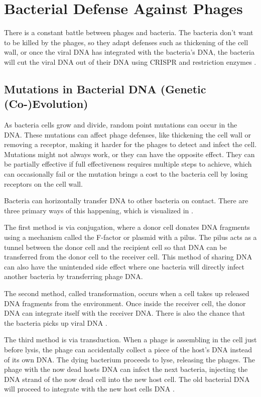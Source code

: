 \section{Bacterial Defense Against Phages} 
There is a constant battle between phages and bacteria. 
The bacteria don't want to be killed by the phages, so they adapt defenses such as thickening of the cell wall, or once the viral DNA has integrated with the bacteria's DNA, the bacteria will cut the viral DNA out of their DNA using CRISPR and restriction enzymes \cite{iglerPhenotypicFluxRole2022}. 

\subsection{Mutations in Bacterial DNA (Genetic (Co-)Evolution)}
As bacteria cells grow and divide, random point mutations can occur in the DNA. 
These mutations can affect phage defenses, like thickening the cell wall or removing a receptor, making it harder for the phages to detect and  infect the cell. 
Mutations might not always work, or they can have the opposite effect. 
They can be partially effective if full effectiveness requires multiple steps to achieve, which can occasionally fail \cite{lenskiTWOSTEPRESISTANCEESCHERICHIA1984} or the mutation brings a cost to the bacteria cell by losing receptors on the cell wall. 

Bacteria can horizontally transfer DNA to other bacteria on contact. 
There are three primary ways of this happening, which is visualized in . 

The first method is via conjugation, where a donor cell donates DNA fragments using a mechanism called the F-factor or plasmid with a pilus. 
The pilus acts as a tunnel between the donor cell and the recipient cell so that DNA can be transferred from the donor cell to the receiver cell. 
This method of sharing DNA can also have the unintended side effect where one bacteria will directly infect another bacteria by transferring phage DNA. 

The second method, called transformation, occurs when a cell takes up released DNA fragments from the environment. 
Once inside the receiver cell, the donor DNA can integrate itself with the receiver DNA. 
There is also the chance that the bacteria picks up viral DNA \cite{chenInsOutsDNA2005}. 

The third method is via transduction. 
When a phage is assembling in the cell just before lysis, the phage can accidentally collect a piece of the host's DNA instead of its own DNA. 
The dying bacterium proceeds to lyse, releasing the phages. 
The phage with the now dead hosts DNA can infect the next bacteria, injecting the DNA strand of the now dead cell into the new host cell. 
The old bacterial DNA will proceed to integrate with the new host cells DNA \cite{tamangHorizontalGeneTransfer2023, kasmanBacteriophages2025}. 

